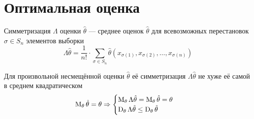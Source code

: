 \section{Оптимальная оценка}
\begin{definition}[Симметризация]
  Симметризация $\Lambda$ оценки $\hat{\theta}$ --- среднее
  оценок $\hat{\theta}$ для
  всевозможных перестановок $\sigma\in S_n$
  элементов выборки \xsample
  $$\Lambda\hat{\theta}
      = \frac{1}{n!}\cdot \sum_{\sigma\in S_n} \hat{\theta}\left(
      x_{\sigma\left(1\right)}, x_{\sigma\left(2\right)},
          \dots, x_{\sigma\left(n\right)}\right)$$
\end{definition}
\begin{lemma}
  Для произвольной несмещённой оценки $\hat{\theta}$
  её симметризация $\Lambda{\hat{\theta}}$
  не хуже её самой в среднем квадратическом
  \begin{align*}
  \operatorname{M}_{\theta} \hat{\theta}
      = \theta
  \Rightarrow
      \begin{cases}
      \operatorname{M}_{\theta} \Lambda{\hat{\theta}}
          = \operatorname{M}_{\theta} \hat{\theta}
          = \theta\\
      \operatorname{D}_{\theta} \Lambda{\hat{\theta}}
          \le\operatorname{D}_{\theta} \hat{\theta}
      \end{cases}
  \end{align*}
\end{lemma}
